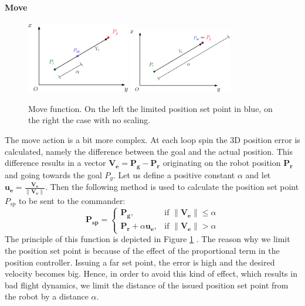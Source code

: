 \paragraph{Move} 

\begin{figure}[h]
\centering
 \includegraphics[width=0.4\textwidth]{move1.eps}\hspace{0.1\textwidth}
 \includegraphics[width=0.4\textwidth]{move2.eps}\\[1em]
 \caption[Move function.]{Move function. On the left the limited position set point in blue, on the right the case with no scaling.}
  \label{figure:move}
\end{figure}

The move action is a bit more complex. At each loop spin the 3D position error is calculated, namely the difference between the goal and the actual position.  This difference results in a vector $\boldsymbol{V_e} = \boldsymbol{P_g} - \boldsymbol{P_r}$ originating on the robot position $\boldsymbol{P_r}$ and going towards the goal $P_g$. Let us define a positive constant $\alpha$ and let $\boldsymbol{u_e} = 	\frac{\boldsymbol{V_e}}{\lVert\boldsymbol{V_e}\rVert}$. Then the following method is used to calculate the position set point $P_{sp}$ to be sent to the commander: 
\begin{equation}
\boldsymbol{P_{sp}} = 
\begin{cases}
    \boldsymbol{P_g}, & \text{if } \lVert\boldsymbol{V_e} \rVert \leq \alpha \\
    \boldsymbol{P_r} + \alpha \boldsymbol{u_e},&    \text{if } \lVert\boldsymbol{V_e}\rVert > \alpha
\end{cases}
\label{eq:move}
\end{equation}
The principle of this function is depicted in Figure \ref{figure:move} . The reason why we limit the position set point is because of the effect of the proportional term in the position controller. Issuing a far set point, the error is high and the desired velocity becomes big. Hence, in order to avoid this kind of effect, which results in bad flight dynamics, we limit the distance of the issued position set point from the robot by a distance $\alpha$.

